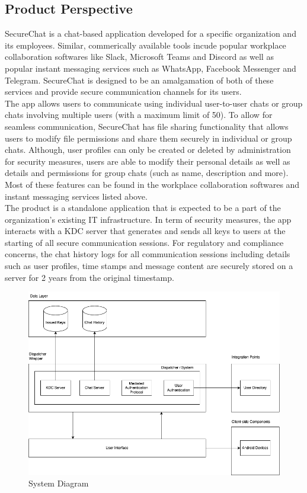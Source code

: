 \documentclass[]{article}
\begin{document}
\subsection{Product Perspective}
\label{sub:product_perspective}
SecureChat is a chat-based application developed for a specific organization and its employees. Similar, commerically available tools incude popular workplace collaboration softwares like Slack, Microsoft Teams and Discord as well as popular instant messaging services such as WhatsApp, Facebook Messenger and Telegram. SecureChat is designed to be an amalgamation of both of these services and provide secure communication channels for its users.\\
\newline
The app allows users to communicate using individual user-to-user chats or group chats involving multiple users (with a maximum limit of 50). To allow for seamless communication, SecureChat has file sharing functionality that allows users to modify file permissions and share them securely in individual or group chats. Although, user profiles can only be created or deleted by administration for security measures, users are able to modify their personal details as well as details and permissions for group chats (such as name, description and more). Most of these features can be found in the workplace collaboration softwares and instant messaging services listed above.\\
\newline
The product is a standalone application that is expected to be a part of the organization's existing IT infrastructure. In term of security measures, the app interacts with a KDC server that generates and sends all keys to users at the starting of all secure communication sessions. For regulatory and compliance concerns, the chat history logs for all communication sessions including details such as user profiles, time stamps and message content are securely stored on a server for 2 years from the original timestamp.\\
\newline
\begin{figure}[H]
	\includegraphics[scale=0.5]{system-diagram.png}
	\caption{System Diagram}
\end{figure}
\end{document}
